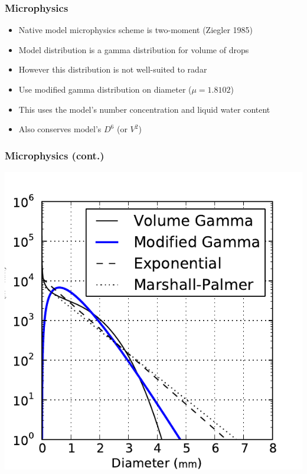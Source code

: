 \documentclass[red]{beamer}
\begin{document}
\begin{frame}[<+->]
	\frametitle{Microphysics}
	\begin{itemize}
		\item Native model microphysics scheme is two-moment (Ziegler 1985)
		\item Model distribution is a gamma distribution for volume of drops
		\item However this distribution is not well-suited to radar
		\item Use modified gamma distribution on diameter ($\mu=1.8102$)
		\item This uses the model's number concentration and liquid water content
		\item Also conserves model's $D^6$ (or $V^2$)
	\end{itemize}
\end{frame}

\begin{frame}
	\frametitle{Microphysics (cont.)}
	\begin{center}
		\includegraphics[scale=0.6]{figures/distribution-comparison.pdf}
	\end{center}
\end{frame}
\end{document}
